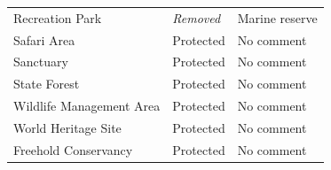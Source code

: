 \documentclass[abstract=on,10pt,a4paper,bibliography=totocnumbered]{scrartcl}
\begin{document}
\begin{table}[h]
\begin{center}
{\begin{tabular}{llp{11cm}}
      Recreation Park &
        \textit{Removed} &
          Marine reserve\\
      Safari Area &
        Protected &
          No comment\\
      Sanctuary &
        Protected &
          No comment\\
      State Forest &
        Protected &
          No comment\\
      Wildlife Management Area &
        Protected &
          No comment\\
      World Heritage Site &
        Protected &
          No comment\\
      Freehold Conservancy &
        Protected &
          No comment\\
      \bottomrule
      \end{tabular}
    }
  \end{center}
\end{table}

\newpage
\end{document}
